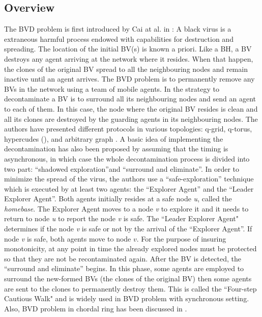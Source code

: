 \subsection{Overview}
The BVD problem is first introduced by Cai at al. in \cite{cai}: A black virus is a  extraneous harmful process endowed with capabilities for destruction and spreading. The location of the initial BV(s) is known a priori. Like a BH, a BV destroys any agent arriving at the network where it resides. When that happen, the clones of the original BV spread to all the  neighbouring nodes and remain inactive until an agent arrives. 
The BVD problem is to permanently remove any BVs in the network using a team of mobile agents. In \cite{cai}  the strategy to decontaminate a BV is to surround all its neighbouring nodes and send an agent to each of them. In this case, the node where the original BV resides is clean and all its clones are destroyed by the guarding agents in its neighbouring nodes. The authors have presented different protocols in various topologies: q-grid, q-torus, hypercudes  (\cite{cai}), and arbitrary graph \cite{cai1}. A basic idea of implementing the decontamination has also been proposed  by   assuming that the timing is asynchronous, in which  case   the whole decontamination process is divided into two part: ``shadowed exploration''and ``surround and eliminate''. In order to minimize the spread of the virus, the authors  use a ``safe-exploration'' technique which is executed by at least two agents: the ``Explorer Agent'' and the ``Leader Explorer Agent''. Both agents  initially resides at a safe node {\em u}, called  the {\em homebase}. The Explorer Agent moves to a node {\em v} to explore it and it needs to return to node {\em u} to report the node {\em v} is safe. The ``Leader Explorer Agent" determines if the node {\em v} is safe or not by the arrival of the ``Explorer Agent''. If node {\em v} is safe, both agents move to node $v$. For the purpose of insuring monotonicity, at any point in time the already explored nodes must be protected so that they are not be recontaminated again. After the BV is detected, the ``surround and eliminate'' begins. In this phase, some agents are employed to surround the new-formed BVs (the clones of the original BV) then some agents are sent to the clones to permanently destroy them. This is called the ``Four-step Cautious Walk" and is widely used in BVD problem with synchronous setting. Also, BVD problem in chordal ring has been discussed in
\cite{alotaibi}.


